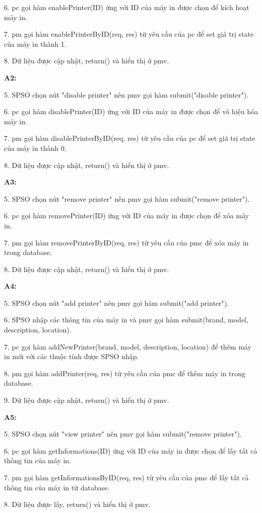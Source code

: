6. pc gọi hàm enablePrinter(ID) ứng với ID của máy in được chọn để kích hoạt máy in.\par
7. pm gọi hàm enablePrinterByID(req, res) từ yêu cầu của pc để set giá trị state của máy in thành 1.\par
8. Dữ liệu được cập nhật, return() và hiển thị ở pmv.\par
\textbf{A2:}\par
5. SPSO chọn nút "disable printer" nên pmv gọi hàm submit("disable printer").\par
6. pc gọi hàm disablePrinter(ID) ứng với ID của máy in được chọn để vô hiệu hóa máy in.\par
7. pm gọi hàm disablePrinterByID(req, res) từ yêu cầu của pc để set giá trị state của máy in thành 0.\par
8. Dữ liệu được cập nhật, return() và hiển thị ở pmv.\par
\textbf{A3:}\par
5. SPSO chọn nút "remove printer" nên pmv gọi hàm submit("remove printer").\par
6. pc gọi hàm removePrinter(ID) ứng với ID của máy in được chọn để xóa máy in.\par
7. pm gọi hàm removePrinterByID(req, res) từ yêu cầu của pmc để xóa máy in trong database.\par
8. Dữ liệu được cập nhật, return() và hiển thị ở pmv.\par
\textbf{A4:}\par
5. SPSO chọn nút "add printer" nên pmv gọi hàm submit("add printer").\par
6. SPSO nhập các thông tin của máy in và pmv gọi hàm submit(brand, model, description, location).\par
7. pc gọi hàm addNewPrinter(brand, model, description, location) để thêm máy in mới với các thuộc tính được SPSO nhập.\par
8. pm gọi hàm addPrinter(req, res) từ yêu cầu của pmc để thêm máy in trong database.\par
9. Dữ liệu được cập nhật, return() và hiển thị ở pmv.\par
\textbf{A5:}\par
5. SPSO chọn nút "view printer" nên pmv gọi hàm submit("remove printer").\par
6. pc gọi hàm getInformations(ID) ứng với ID của máy in được chọn để lấy tất cả thông tin của máy in.\par
7. pm gọi hàm getInformationsByID(req, res) từ yêu cầu của pmc để lấy tất cả thông tin của máy in từ database.\par
8. Dữ liệu được lấy, return() và hiển thị ở pmv.\par

